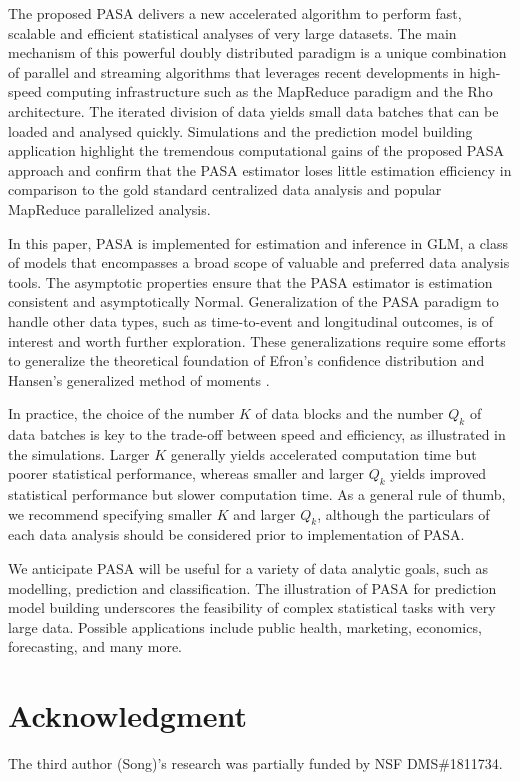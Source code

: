 \documentclass[12pt]{article}
\begin{document}
The proposed PASA delivers a new accelerated algorithm to perform fast, scalable and efficient statistical analyses of very large datasets. The main mechanism of this powerful doubly distributed paradigm is a unique combination of parallel and streaming algorithms that leverages recent developments in high-speed computing infrastructure such as the MapReduce paradigm and the Rho architecture. The iterated division of data yields small data batches that can be loaded and analysed quickly. Simulations and the prediction model building application highlight the tremendous computational gains of the proposed PASA approach and confirm that the PASA estimator loses little  estimation efficiency in comparison to the gold standard centralized data analysis and popular MapReduce parallelized analysis.

In this paper, PASA is implemented for estimation and inference in GLM, a class of models that encompasses a broad scope of valuable and preferred data analysis tools. The asymptotic properties ensure that the PASA estimator is estimation consistent and asymptotically Normal. Generalization of the PASA paradigm to handle other data types, such as time-to-event and longitudinal outcomes, is of interest and worth further exploration. These generalizations require some efforts to generalize the theoretical foundation of Efron's confidence distribution \cite{Efron1993} and Hansen's generalized method of moments \cite{Hansen}. 

In practice, the choice of the number $K$ of data blocks and the number $Q_k$ of data batches is key to the trade-off between speed and efficiency, as illustrated in the simulations. Larger $K$ generally yields accelerated computation time but poorer statistical performance, whereas smaller and larger $Q_k$ yields improved statistical performance but slower computation time. As a general rule of thumb, we recommend specifying smaller $K$ and larger $Q_k$, although the particulars of each data analysis should be considered prior to implementation of PASA.

We anticipate PASA will be useful for a variety of data analytic goals, such as modelling, prediction and classification. The illustration of PASA for prediction model building underscores the feasibility of complex statistical tasks with very large data. Possible applications include public health, marketing, economics, forecasting, and many more.

\section*{Acknowledgment}

The third author (Song)'s research was partially funded by NSF DMS\#1811734.  



\end{document}
